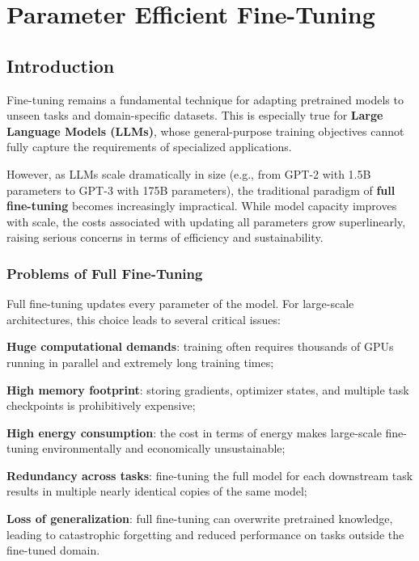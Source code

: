 \chapter{Parameter Efficient Fine-Tuning}

\section{Introduction}

Fine-tuning remains a fundamental technique for adapting pretrained models to unseen tasks and
domain-specific datasets. This is especially true for \textbf{Large Language Models (LLMs)},
whose general-purpose training objectives cannot fully capture the requirements of specialized
applications.

However, as LLMs scale dramatically in size (e.g., from GPT-2 with 1.5B parameters to GPT-3 with
175B parameters), the traditional paradigm of \textbf{full fine-tuning} becomes increasingly
impractical. While model capacity improves with scale, the costs associated with updating all
parameters grow superlinearly, raising serious concerns in terms of efficiency and
sustainability.

\subsection{Problems of Full Fine-Tuning}
Full fine-tuning updates every parameter of the model. For large-scale architectures, this
choice leads to several critical issues:
\begin{compactitemize}
    \item \textbf{Huge computational demands}: training often requires thousands of GPUs running
    in parallel and extremely long training times;
    \item \textbf{High memory footprint}: storing gradients, optimizer states, and multiple task
    checkpoints is prohibitively expensive;
    \item \textbf{High energy consumption}: the cost in terms of energy makes large-scale
    fine-tuning environmentally and economically unsustainable;
    \item \textbf{Redundancy across tasks}: fine-tuning the full model for each downstream task
    results in multiple nearly identical copies of the same model;
    \item \textbf{Loss of generalization}: full fine-tuning can overwrite pretrained knowledge,
    leading to catastrophic forgetting and reduced performance on tasks outside the fine-tuned
    domain.
\end{compactitemize}

